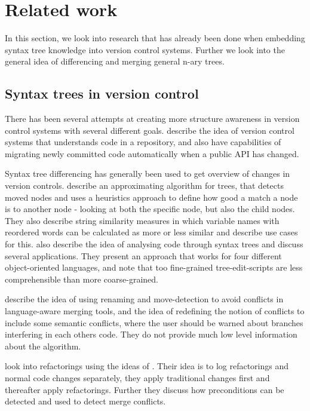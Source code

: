 \documentclass[11pt]{article}
\begin{document}
\clearpage
\section{Related work}
In this section, we look into research that has already been done when embedding syntax tree knowledge into version control systems. Further we look into the general idea of differencing and merging general n-ary trees.

\subsection{Syntax trees in version control}
\label{SyntaxTreesVersionControl}
There has been several attempts at creating more structure awareness in version control systems with several different goals. \citet{Freese} describe the idea of version control systems that understands code in a repository, and also have capabilities of migrating newly committed code automatically when a public API has changed.

Syntax tree differencing has generally been used to get overview of changes in version controls. \citet{Fluri} describe an approximating algorithm for trees, that detects moved nodes and uses a heuristics approach to define how good a match a node is to another node - looking at both the specific node, but also the child nodes. They also describe string similarity measures in which variable names with reordered words can be calculated as more or less similar and describe use cases for this. \citet{Hashimoto} also describe the idea of analysing code through syntax trees and discuss several applications. They present an approach that works for four different object-oriented languages, and note that too fine-grained tree-edit-scripts are less comprehensible than more coarse-grained.

\citet{Hunt} describe the idea of using renaming and move-detection to avoid conflicts in language-aware merging tools, and the idea of redefining the notion of conflicts to include some semantic conflicts, where the user should be warned about branches interfering in each others code. They do not provide much low level information about the algorithm.

\citet{Ekman} look into refactorings using the ideas of \citet{Lippe}. Their idea is to log refactorings and normal code changes separately, they apply traditional changes first and thereafter apply refactorings. Further they discuss how preconditions can be detected and used to detect merge conflicts.
\end{document}
